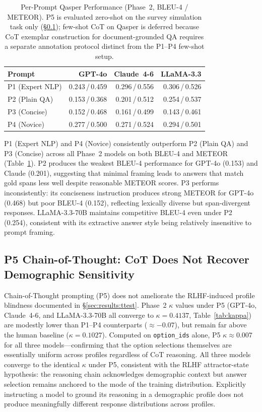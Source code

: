 \documentclass[sigconf,nonacm]{acmart}
\begin{document}
\begin{table}[t]
\caption{Per-Prompt Qasper Performance (Phase~2, BLEU-4 / METEOR).
  P5 is evaluated zero-shot on the survey simulation task only (\S\ref{sec:results:p5});
  few-shot CoT on Qasper is deferred because CoT exemplar construction for
  document-grounded QA requires a separate annotation protocol distinct from
  the P1--P4 few-shot setup.}
\label{tab:prompts}
\centering\small
\setlength{\tabcolsep}{4pt}
\begin{tabular}{lrrr}
\toprule
\textbf{Prompt} & \textbf{GPT-4o} & \textbf{Claude~4-6} & \textbf{LLaMA-3.3} \\
\midrule
P1 (Expert NLP) & 0.243\,/\,0.459 & 0.296\,/\,0.556 & 0.306\,/\,0.526 \\
P2 (Plain QA)   & 0.153\,/\,0.368 & 0.201\,/\,0.512 & 0.254\,/\,0.537 \\
P3 (Concise)    & 0.152\,/\,0.468 & 0.161\,/\,0.499 & 0.143\,/\,0.461 \\
P4 (Novice)     & 0.277\,/\,0.500 & 0.271\,/\,0.524 & 0.294\,/\,0.501 \\
\bottomrule
\end{tabular}
\end{table}

P1 (Expert NLP) and P4 (Novice) consistently outperform P2 (Plain QA)
and P3 (Concise) across all Phase~2 models on both BLEU-4 and METEOR
(Table~\ref{tab:prompts}).
P2 produces the weakest BLEU-4 performance for GPT-4o (0.153) and Claude
(0.201), suggesting that minimal framing leads to answers that match gold
spans less well despite reasonable METEOR scores.
P3 performs inconsistently: its conciseness instruction produces strong
METEOR for GPT-4o (0.468) but poor BLEU-4 (0.152), reflecting lexically
diverse but span-divergent responses.
LLaMA-3.3-70B maintains competitive BLEU-4 even under P2 (0.254), consistent
with its extractive answer style being relatively insensitive to prompt
framing.

\subsection{P5 Chain-of-Thought: CoT Does Not Recover Demographic Sensitivity}
\label{sec:results:p5}

Chain-of-Thought prompting (P5) does not ameliorate the RLHF-induced
profile blindness documented in \S\ref{sec:results:ttest}.
Phase~2 $\kappa$ values under P5 (GPT-4o, Claude~4-6, and LLaMA-3.3-70B
all converge to $\kappa{=}0.4137$, Table~\ref{tab:kappa}) are modestly
lower than P1--P4 counterparts ($\approx{-}0.07$), but remain far above
the human baseline ($\kappa{=}0.1027$).
Computed on \texttt{option\_ids} alone, P5 $\kappa{\approx}0.007$ for all
three models---confirming that the option selections themselves are
essentially uniform across profiles regardless of CoT reasoning.
All three models converge to the identical $\kappa$ under P5, consistent
with the RLHF attractor-state hypothesis: the reasoning chain acknowledges
demographic context but answer selection remains anchored to the mode of
the training distribution.
Explicitly instructing a model to ground its reasoning in a demographic
profile does not produce meaningfully different response distributions
across profiles.
\end{document}
